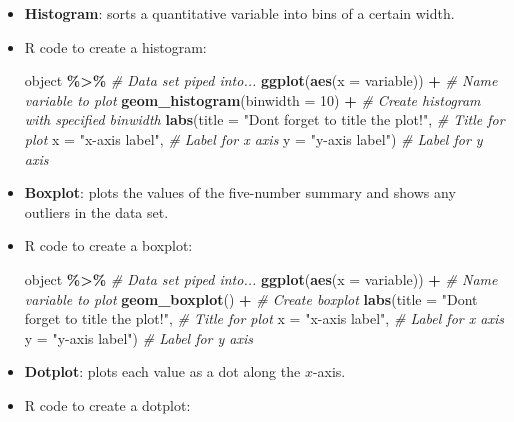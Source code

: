 \documentclass[
]{report}
\newenvironment{Shaded}{\begin{snugshade}}{\end{snugshade}}
\newcommand{\AttributeTok}[1]{\textcolor[rgb]{0.13,0.29,0.53}{#1}}
\newcommand{\CommentTok}[1]{\textcolor[rgb]{0.56,0.35,0.01}{\textit{#1}}}
\newcommand{\DecValTok}[1]{\textcolor[rgb]{0.00,0.00,0.81}{#1}}
\newcommand{\FunctionTok}[1]{\textcolor[rgb]{0.13,0.29,0.53}{\textbf{#1}}}
\newcommand{\NormalTok}[1]{#1}
\newcommand{\SpecialCharTok}[1]{\textcolor[rgb]{0.81,0.36,0.00}{\textbf{#1}}}
\newcommand{\StringTok}[1]{\textcolor[rgb]{0.31,0.60,0.02}{#1}}
\begin{document}
\begin{itemize}
\item
  \textbf{Histogram}: sorts a quantitative variable into bins of a certain width.
\item
  R code to create a histogram:

\begin{Shaded}
\begin{Highlighting}[]
\NormalTok{object }\SpecialCharTok{\%\textgreater{}\%} \CommentTok{\# Data set piped into...}
    \FunctionTok{ggplot}\NormalTok{(}\FunctionTok{aes}\NormalTok{(}\AttributeTok{x =}\NormalTok{ variable)) }\SpecialCharTok{+}   \CommentTok{\# Name variable to plot}
    \FunctionTok{geom\_histogram}\NormalTok{(}\AttributeTok{binwidth =} \DecValTok{10}\NormalTok{) }\SpecialCharTok{+}  \CommentTok{\# Create histogram with specified binwidth}
    \FunctionTok{labs}\NormalTok{(}\AttributeTok{title =} \StringTok{"Don\textquotesingle{}t forget to title the plot!"}\NormalTok{, }\CommentTok{\# Title for plot}
        \AttributeTok{x =} \StringTok{"x{-}axis label"}\NormalTok{, }\CommentTok{\# Label for x axis}
        \AttributeTok{y =} \StringTok{"y{-}axis label"}\NormalTok{) }\CommentTok{\# Label for y axis}
\end{Highlighting}
\end{Shaded}
\item
  \textbf{Boxplot}: plots the values of the five-number summary and shows any outliers in the data set.
\item
  R code to create a boxplot:

\begin{Shaded}
\begin{Highlighting}[]
\NormalTok{object }\SpecialCharTok{\%\textgreater{}\%} \CommentTok{\# Data set piped into...}
    \FunctionTok{ggplot}\NormalTok{(}\FunctionTok{aes}\NormalTok{(}\AttributeTok{x =}\NormalTok{ variable)) }\SpecialCharTok{+} \CommentTok{\# Name variable to plot}
    \FunctionTok{geom\_boxplot}\NormalTok{() }\SpecialCharTok{+} \CommentTok{\# Create boxplot }
    \FunctionTok{labs}\NormalTok{(}\AttributeTok{title =} \StringTok{"Don\textquotesingle{}t forget to title the plot!"}\NormalTok{, }\CommentTok{\# Title for plot}
        \AttributeTok{x =} \StringTok{"x{-}axis label"}\NormalTok{, }\CommentTok{\# Label for x axis}
        \AttributeTok{y =} \StringTok{"y{-}axis label"}\NormalTok{) }\CommentTok{\# Label for y axis}
\end{Highlighting}
\end{Shaded}
\item
  \textbf{Dotplot}: plots each value as a dot along the \(x\)-axis.
\item
  R code to create a dotplot:


\end{itemize}
\end{document}
